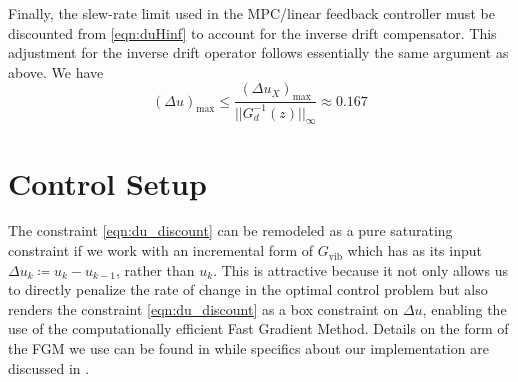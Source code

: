 \documentclass[twocolumn,twoside]{IEEEtran}
\newcommand{\Gv}{\ensuremath{G_{\text{vib}}}\xspace}
\begin{document}

Finally, the slew-rate limit used in the MPC/linear feedback controller must be discounted from \eqref{eqn:duHinf} to account for the inverse drift compensator. This adjustment for the inverse drift operator follows essentially the same argument as above. We have
\begin{equation}
  (\Delta u)_{\text{max}} \leq \frac{(\Delta u_X)_{\text{max}}}{||G^{-1}_d(z)||_{\infty}} \approx 0.167 \label{eqn:du_discount}
\end{equation}
\section{Control Setup}\label{sec:control_setup}
The constraint \eqref{eqn:du_discount} can be remodeled as a pure saturating constraint if we work with an incremental form of \(\Gv\) which has as its input \({\Delta u_k\coloneqq u_k-u_{k-1}}\), rather than \(u_k\). This is attractive because it not only allows us to directly penalize the rate of change in the optimal control problem but also renders the constraint \eqref{eqn:du_discount} as a box constraint on $\Delta u$, enabling the use of the computationally efficient Fast Gradient Method. Details on the form of the FGM we use can be found in \cite{Jerez_Trans_2014, jerez_embedded_2013} while specifics about our implementation are discussed in \cite{braker_application_2017}.
\end{document}
